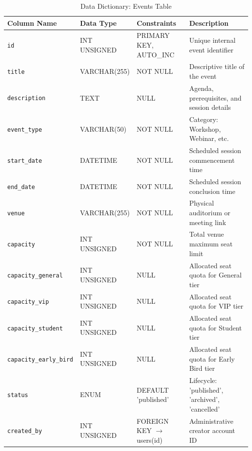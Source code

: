 \documentclass[11pt,a4paper]{report}
\begin{document}
\begin{table}[H]
\centering
\fontsize{8.5}{11}\selectfont
\renewcommand{\arraystretch}{1.3}
\setlength{\tabcolsep}{4pt}
\caption{Data Dictionary: Events Table}
\label{tab:dict_events}
\begin{tabularx}{\textwidth}{|p{}|p{}|p{}|X|}
\hline
\rowcolor{TCSBlue}
\color{white}\bfseries Column Name & 
\color{white}\bfseries Data Type & 
\color{white}\bfseries Constraints & 
\color{white}\bfseries Description \\\hline

\texttt{id} & INT UNSIGNED & PRIMARY KEY, AUTO\_INC & Unique internal event identifier \\\hline
\texttt{title} & VARCHAR(255) & NOT NULL & Descriptive title of the event \\\hline
\texttt{description} & TEXT & NULL & Agenda, prerequisites, and session details \\\hline
\texttt{event\_type} & VARCHAR(50) & NOT NULL & Category: Workshop, Webinar, etc. \\\hline
\texttt{start\_date} & DATETIME & NOT NULL & Scheduled session commencement time \\\hline
\texttt{end\_date} & DATETIME & NOT NULL & Scheduled session conclusion time \\\hline
\texttt{venue} & VARCHAR(255) & NOT NULL & Physical auditorium or meeting link \\\hline
\texttt{capacity} & INT UNSIGNED & NOT NULL & Total venue maximum seat limit \\\hline
\texttt{capacity\_general} & INT UNSIGNED & NULL & Allocated seat quota for General tier \\\hline
\texttt{capacity\_vip} & INT UNSIGNED & NULL & Allocated seat quota for VIP tier \\\hline
\texttt{capacity\_student} & INT UNSIGNED & NULL & Allocated seat quota for Student tier \\\hline
\texttt{capacity\_early\_bird} & INT UNSIGNED & NULL & Allocated seat quota for Early Bird tier \\\hline
\texttt{status} & ENUM & DEFAULT 'published' & Lifecycle: 'published', 'archived', 'cancelled' \\\hline
\texttt{created\_by} & INT UNSIGNED & FOREIGN KEY $\to$ users(id) & Administrative creator account ID \\\hline
\end{tabularx}
\end{table}
\end{document}
